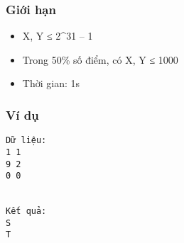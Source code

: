 \subsubsection{   Giới hạn  }
\begin{itemize}
	\item     X, Y ≤ 2\textasciicircum31 – 1   
	\item     Trong 50\% số điểm, có X, Y ≤ 1000   
	\item     Thời gian: 1s   
\end{itemize}

\subsubsection{   Ví dụ  }
\begin{verbatim}
Dữ liệu:
1 1
9 2
0 0


Kết quả:
S
T

\end{verbatim}